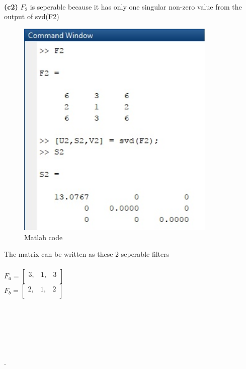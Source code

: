 \documentclass[]{article}
\begin{document}
\\\\\\\\\\\\
\\\\\\\\\\\\
\\\\\\\\\\\\
\\
\\
\textbf{(c2)} $F_{2}$ is seperable because it has only one singular non-zero value from the output of svd(F2)
 \begin{figure}[h!]
 \centering
  \includegraphics[width=0.85\textwidth]{img/svdF2.jpg}
 \caption{Matlab code} 
 \end{figure}
 The matrix can be written as these 2 seperable filters \\
\\
$ F_{a} =
 \begin{bmatrix}
     3, & 1, & 3 \\
 \end{bmatrix}
$ \\
$ F_{b} = 
 \begin{bmatrix}
     2, & 1, & 2 \\
 \end{bmatrix}
$
\\\\\\\\\\\\\\.
\end{document}
